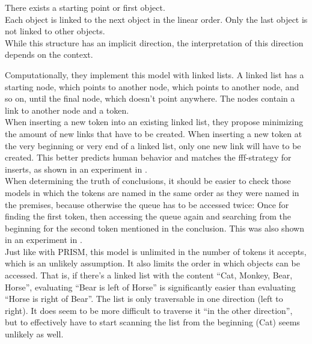 \documentclass[hidelinks]{scrartcl}
\begin{document}
\begin{displayquote}
There exists a starting point or first object. \\
Each object is linked to the next object in the linear
order. Only the last object is not linked to other
objects. \\
While this structure has an implicit direction, the
interpretation of this direction depends on the
context.\\
\citep{Krumnack.2011}
\end{displayquote}

Computationally, they implement this model with linked lists. A linked list has a starting node, which points to another node, which points to another node, and so on, until the final node, which doesn't point anywhere. The nodes contain a link to another node and a \gls{token}. \\

When inserting a new \gls{token} into an existing linked list, they propose minimizing the amount of new links that have to be created. When inserting a new \gls{token} at the very beginning or very end of a linked list, only one new link will have to be created. This better predicts human behavior and matches the fff-strategy for inserts, as shown in an experiment in \cite{Krumnack.2011}. \\

When determining the truth of \gls{conclusion}s, it should be easier to check those models in which the \gls{token}s are named in the same order as they were named in the \gls{premise}s, because otherwise the queue has to be accessed twice: Once for finding the first \gls{token}, then accessing the queue again and searching from the beginning for the second \gls{token} mentioned in the \gls{conclusion}. This was also shown in an experiment in \cite{Krumnack.2011}. \\

Just like with PRISM, this model is unlimited in the number of \gls{token}s it accepts, which is an unlikely assumption. It also limits the order in which objects can be accessed. That is, if there's a linked list with the content ``Cat, Monkey, Bear, Horse'', evaluating ``Bear is left of Horse'' is significantly easier than evaluating ``Horse is right of Bear''. The list is only traversable in one direction (left to right). It does seem to be more difficult to traverse it ``in the other direction'', but to effectively have to start scanning the list from the beginning (Cat) seems unlikely as well.
\end{document}
